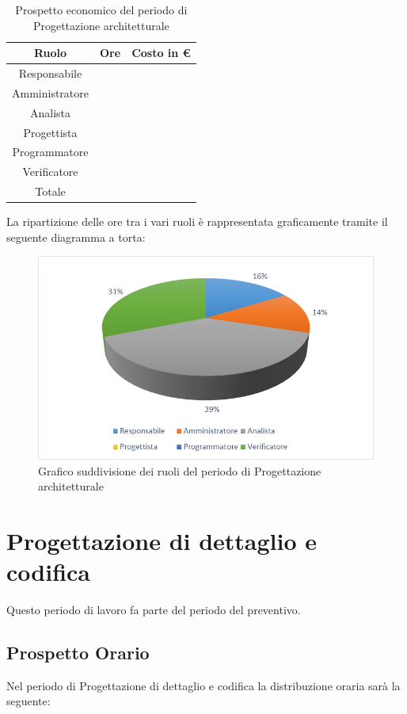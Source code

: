 \documentclass[./PianodiProgetto.tex]{subfiles}
\begin{document}
\begin{table}[H]
	\centering
	\begin{tabular}{|c|c|c|}
		\hline
		Ruolo&Ore&Costo in € \\ \hline
		Responsabile& &  \\ \hline
		Amministratore& &  \\ \hline
		Analista& &  \\ \hline
		Progettista& &  \\ \hline
		Programmatore& &  \\ \hline
		Verificatore& &  \\ \hline
		Totale& & \\ \hline
	\end{tabular}
	\caption{Prospetto economico del periodo di Progettazione architetturale}
\end{table}

La ripartizione delle ore tra i vari ruoli è rappresentata graficamente tramite il seguente diagramma a torta:
\begin{figure}[H]
	\centering
	\includegraphics[width=1\linewidth]{img/grafici/ProgettazioneArchitetturaleProspettoEconomico}
	\caption{Grafico suddivisione dei ruoli del periodo di Progettazione architetturale}
	\label{fig:progettazione-architetturale-prospetto-economico}
\end{figure}

\section{Progettazione di dettaglio e codifica}
Questo periodo di lavoro fa parte del periodo del preventivo.
\subsection{Prospetto Orario}
Nel periodo di Progettazione di dettaglio e codifica la distribuzione oraria sarà la seguente:
\end{document}
